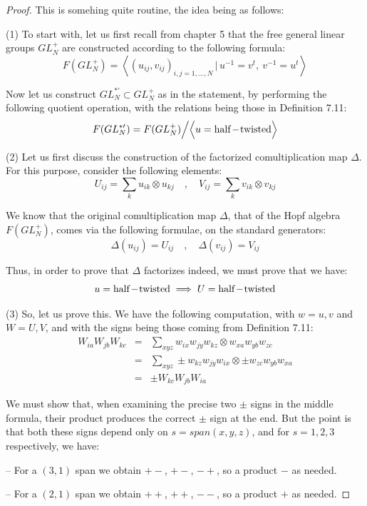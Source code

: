 \documentclass[12pt]{amsbook}
\begin{document}
\begin{proof}
This is somehing quite routine, the idea being as follows:

\medskip

(1) To start with, let us first recall from chapter 5 that the free general linear groups $GL_N^+$ are constructed according to the following formula:
$$F(GL_N^+)=\left<(u_{ij},v_{ij})_{i,j=1,\ldots,N}\,\Big|\,u^{-1}=v^t,\ v^{-1}=u^t\right>$$

Now let us construct $GL_N^{*\prime}\subset GL_N^+$ as in the statement, by performing the following quotient operation, with the relations being those in Definition 7.11:
$$F(GL_N^{*\prime})=F(GL_N^+)\Big/\Big<u={\rm half\!-\!twisted}\Big>$$

(2) Let us first discuss the construction of the factorized comultiplication map $\Delta$. For this purpose, consider the following elements:
$$U_{ij}=\sum_ku_{ik}\otimes u_{kj}\quad, \quad V_{ij}=\sum_kv_{ik}\otimes v_{kj}$$

We know that the original comultiplication map $\Delta$, that of the Hopf algebra $F(GL_N^+)$, comes via the following formulae, on the standard generators:
$$\Delta(u_{ij})=U_{ij}\quad,\quad\Delta(v_{ij})=V_{ij}$$

Thus, in order to prove that $\Delta$ factorizes indeed, we must prove that we have:
$$u={\rm half\!-\!twisted}\implies U={\rm half\!-\!twisted}$$

(3) So, let us prove this. We have the following computation, with $w=u,v$ and $W=U,V$, and with the signs being those coming from Definition 7.11:
\begin{eqnarray*}
W_{ia}W_{jb}W_{kc}
&=&\sum_{xyz}w_{ix}w_{jy}w_{kz}\otimes w_{xa}w_{yb}w_{zc}\\
&=&\sum_{xyz}\pm w_{kz}w_{jy}w_{ix}\otimes\pm w_{zc}w_{yb}w_{xa}\\
&=&\pm W_{kc}W_{jb}W_{ia}
\end{eqnarray*}

We must show that, when examining the precise two $\pm$ signs in the middle formula, their product produces the correct $\pm$ sign at the end. But the point is that both these signs depend only on $s=span(x,y,z)$, and for $s=1,2,3$ respectively, we have:

\medskip

-- For a $(3,1)$ span we obtain $+-$, $+-$, $-+$, so a product $-$ as needed.

\smallskip

-- For a $(2,1)$ span we obtain $++$, $++$, $--$, so a product $+$ as needed.


\end{proof}
\end{document}
